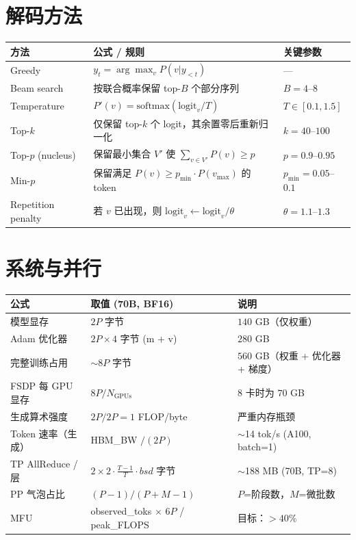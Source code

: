 \section{解码方法}
\label{decoding-methods}

\noindent\begin{tabularx}{\linewidth}{@{}l Z{1.42} Z{0.58}@{}}
\toprule
\textbf{方法} & \textbf{公式 / 规则} & \textbf{关键参数} \\
\midrule
Greedy & $y_t = \arg\max_v P(v|y_{<t})$ & --- \\
Beam search & 按联合概率保留 top-$B$ 个部分序列 & $B=4$--$8$ \\
Temperature & $P'(v) = \text{softmax}(\text{logit}_v / T)$ & $T \in [0.1, 1.5]$ \\
Top-$k$ & 仅保留 top-$k$ 个 logit，其余置零后重新归一化 & $k=40$--$100$ \\
Top-$p$ (nucleus) & 保留最小集合 $V'$ 使 $\sum_{v \in V'} P(v) \geq p$ & $p=0.9$--$0.95$ \\
Min-$p$ & 保留满足 $P(v) \geq p_\text{min} \cdot P(v_\text{max})$ 的 token & $p_\text{min}=0.05$--$0.1$ \\
Repetition penalty & 若 $v$ 已出现，则 $\text{logit}_v \leftarrow \text{logit}_v / \theta$ & $\theta=1.1$--$1.3$ \\
\bottomrule
\end{tabularx}

\section{系统与并行}
\label{systems-parallelism}

\noindent\begin{tabularx}{\linewidth}{@{}l Z{1.07} Z{0.93}@{}}
\toprule
\textbf{公式} & \textbf{取值 (70B, BF16)} & \textbf{说明} \\
\midrule
模型显存 & $2P$ 字节 & $140$ GB（仅权重） \\
Adam 优化器 & $2P \times 4$ 字节 (m + v) & $280$ GB \\
完整训练占用 & $\sim 8P$ 字节 & $560$ GB（权重 + 优化器 + 梯度） \\
FSDP 每 GPU 显存 & $8P / N_\text{GPUs}$ & 8 卡时为 $70$ GB \\
生成算术强度 & $2P / 2P = 1$ FLOP/byte & 严重内存瓶颈 \\
Token 速率（生成） & HBM\_BW $/ (2P)$ & $\sim$14 tok/s (A100, batch=1) \\
TP AllReduce / 层 & $2 \times 2 \cdot \frac{T-1}{T} \cdot bsd$ 字节 & $\sim$188 MB (70B, TP=8) \\
PP 气泡占比 & $(P-1)/(P+M-1)$ & $P$=阶段数，$M$=微批数 \\
MFU & observed\_toks $\times$ 6$P$ / peak\_FLOPS & 目标：$>40\%$ \\
\bottomrule
\end{tabularx}

